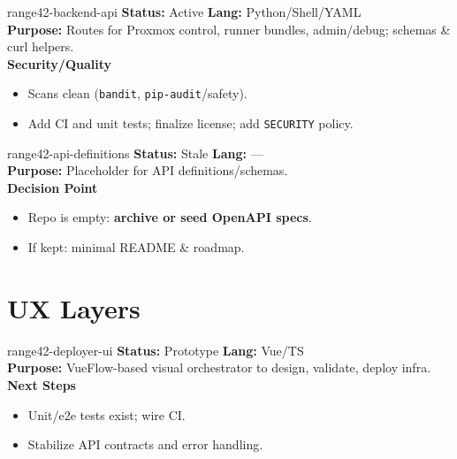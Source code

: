 \documentclass[aspectratio=169]{beamer}
\begin{document}
\begin{frame}{range42-backend-api \; \faProjectDiagram}
  \textbf{Status:} Active \hfill \textbf{Lang:} Python/Shell/YAML\\[2mm]
  \textbf{Purpose:} Routes for Proxmox control, runner bundles, admin/debug; schemas \& curl helpers.\\[2mm]
  \textbf{Security/Quality}
  \begin{itemize}
    \item Scans clean (\texttt{bandit}, \texttt{pip-audit}/safety).
    \item \alert{Add CI and unit tests}; finalize license; add \texttt{SECURITY} policy.
  \end{itemize}
\end{frame}

\begin{frame}{range42-api-definitions \; \faSitemap}
  \textbf{Status:} Stale \hfill \textbf{Lang:} —\\[2mm]
  \textbf{Purpose:} Placeholder for API definitions/schemas.\\[2mm]
  \textbf{Decision Point}
  \begin{itemize}
    \item Repo is empty: \textbf{archive or seed OpenAPI specs}.
    \item If kept: minimal README \& roadmap.
  \end{itemize}
\end{frame}

\section{UX Layers}

\begin{frame}{range42-deployer-ui \; \faDrawPolygon}
  \textbf{Status:} Prototype \hfill \textbf{Lang:} Vue/TS\\[2mm]
  \textbf{Purpose:} VueFlow-based visual orchestrator to design, validate, deploy infra.\\[2mm]
  \textbf{Next Steps}
  \begin{itemize}
    \item Unit/e2e tests exist; wire CI.
    \item Stabilize API contracts and error handling.
  \end{itemize}
\end{frame}
\end{document}
